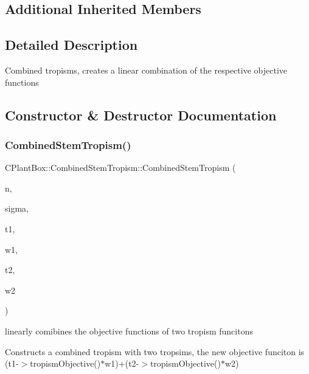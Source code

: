 \subsection*{Additional Inherited Members}


\subsection{Detailed Description}
Combined tropisms, creates a linear combination of the respective objective functions 

\subsection{Constructor \& Destructor Documentation}
\mbox{\label{classCPlantBox_1_1CombinedStemTropism_ae3d20067c6cd334b68daa7c6608a6f76}} 
\subsubsection{\texorpdfstring{Combined\+Stem\+Tropism()}{CombinedStemTropism()}}
{\footnotesize\ttfamily C\+Plant\+Box\+::\+Combined\+Stem\+Tropism\+::\+Combined\+Stem\+Tropism (\begin{DoxyParamCaption}\item[{double}]{n,  }\item[{double}]{sigma,  }\item[{\hyperlink{classCPlantBox_1_1StemTropismFunction}{Stem\+Tropism\+Function} $\ast$}]{t1,  }\item[{double}]{w1,  }\item[{\hyperlink{classCPlantBox_1_1StemTropismFunction}{Stem\+Tropism\+Function} $\ast$}]{t2,  }\item[{double}]{w2 }\end{DoxyParamCaption})}



linearly comibines the objective functions of two tropism funcitons 

Constructs a combined tropism with two tropsims, the new objective funciton is (t1-\/$>$tropism\+Objective()$\ast$w1)+(t2-\/$>$tropism\+Objective()$\ast$w2)


